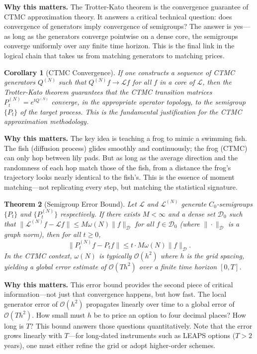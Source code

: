 \documentclass[11pt,a4paper,openany]{book}
\theoremstyle{definition}
\theoremstyle{plain}
\newtheorem{theorem}{Theorem}[chapter]
\newtheorem{corollary}[theorem]{Corollary}
\theoremstyle{remark}
\newcommand{\1}{\mathbbm{1}}
\newcommand{\calL}{\mathcal{L}}
\newcommand{\calD}{\mathcal{D}}
\begin{document}
\medskip
\noindent\textbf{Why this matters.} The Trotter-Kato theorem is the convergence guarantee of CTMC approximation theory. It answers a critical technical question: does convergence of generators imply convergence of semigroups? The answer is yes---as long as the generators converge pointwise on a dense core, the semigroups converge uniformly over any finite time horizon. This is the final link in the logical chain that takes us from matching generators to matching prices.

\begin{corollary}[CTMC Convergence]
If one constructs a sequence of CTMC generators $Q^{(N)}$ such that $Q^{(N)} f \to \calL f$ for all $f$ in a core of $\calL$, then the Trotter-Kato theorem guarantees that the CTMC transition matrices $P_{t}^{(N)} = e^{t Q^{(N)}}$ converge, in the appropriate operator topology, to the semigroup $\{P_{t}\}$ of the target process. This is the fundamental justification for the CTMC approximation methodology.
\end{corollary}

\medskip
\noindent\textbf{Why this matters.} The key idea is teaching a frog to mimic a swimming fish. The fish (diffusion process) glides smoothly and continuously; the frog (CTMC) can only hop between lily pads. But as long as the average direction and the randomness of each hop match those of the fish, from a distance the frog's trajectory looks nearly identical to the fish's. This is the essence of moment matching---not replicating every step, but matching the statistical signature.

\begin{theorem}[Semigroup Error Bound]
Let $\calL$ and $\calL^{(N)}$ generate $C_{0}$-semigroups $\{P_{t}\}$ and $\{P_{t}^{(N)}\}$ respectively. If there exists $M < \infty$ and a dense set $\calD_{0}$ such that $\|\calL^{(N)} f - \calL f\| \leq M \omega(N) \|f\|_{\calD}$ for all $f \in \calD_{0}$ (where $\|\cdot\|_{\calD}$ is a graph norm), then for all $t \geq 0$,
\[
\|P_{t}^{(N)} f - P_{t} f\| \leq t \cdot M \omega(N) \|f\|_{\calD}.
\]
In the CTMC context, $\omega(N)$ is typically $\mathcal{O}(h^{2})$ where $h$ is the grid spacing, yielding a global error estimate of $\mathcal{O}(T h^{2})$ over a finite time horizon $[0, T]$.
\end{theorem}

\medskip
\noindent\textbf{Why this matters.} This error bound provides the second piece of critical information---not just that convergence happens, but how fast. The local generator error of $\mathcal{O}(h^2)$ propagates linearly over time to a global error of $\mathcal{O}(T h^2)$. How small must $h$ be to price an option to four decimal places? How long is $T$? This bound answers those questions quantitatively. Note that the error grows linearly with $T$---for long-dated instruments such as LEAPS options ($T > 2$ years), one must either refine the grid or adopt higher-order schemes.
\end{document}
